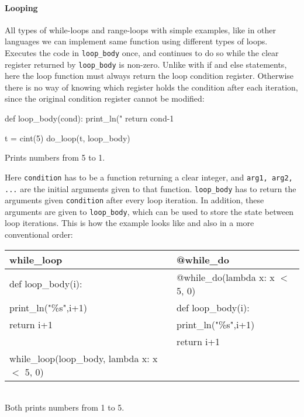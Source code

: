 \begin{mylisting}
\paragraph{Looping}
All types of while-loops and range-loops with simple examples, like in other languages we can implement same function using different types of loops.
Executes the code in \verb|loop_body| once, and continues to do so while the clear register returned by \verb|loop_body| is non-zero. Unlike with if and else statements, here the loop function must always return the loop condition register. Otherwise there is no way of knowing which register holds the condition after each iteration, since the original condition register cannot be modified: 
\begin{mylisting}
def loop_body(cond):
    print_ln("%
    return cond-1

t = cint(5)
do_loop(t, loop_body)
\end{mylisting}
\begin{footnotesize}
Prints numbers from 5 to 1.
\end{footnotesize}

Here \verb+condition+ has to be a function returning a clear integer, and \verb+arg1, arg2, ...+ are the initial arguments given to that
function. \verb+loop_body+ has to return the arguments given \verb+condition+ after every loop iteration. In addition, these arguments are given to \verb+loop_body+, which can be used to store the state between loop iterations. This is how the example looks like and also in a more conventional order:

\begin{center}
\begin{tabular}{|l|l|} \hline
\textbf{while_loop}                         & \textbf{@while_do}                \\ \hline
def loop_body(i):                           & @while_do(lambda x: x $<$ 5, 0)  \\
\hspace{5 mm}print_ln("\%s",i+1)            & def loop_body(i):                \\
\hspace{5 mm}return i+1                     & \hspace{5 mm}print_ln("\%s",i+1) \\
                                            & \hspace{5 mm}return i+1          \\
while_loop(loop_body, lambda x: x $<$ 5, 0) &                                  \\ \hline
\end{tabular}
\begin{footnotesize}
\\ Both prints numbers from 1 to 5.
\end{footnotesize}
\end{center}


\end{mylisting}
